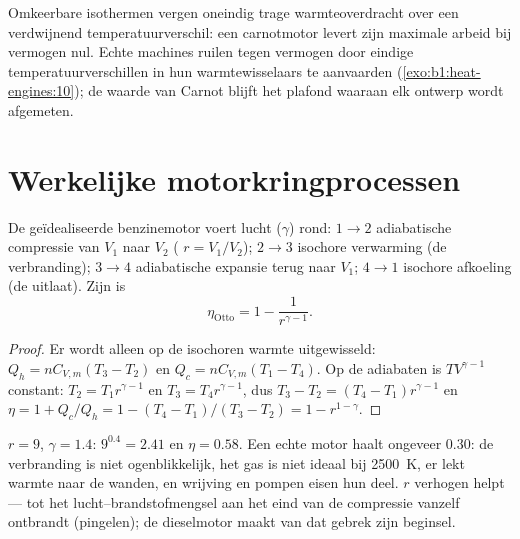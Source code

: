 \begin{remark}\label{rem:b1:heat-engines:notengine}
Omkeerbare isothermen vergen oneindig trage warmteoverdracht over een
verdwijnend temperatuurverschil: een carnotmotor levert zijn maximale arbeid
bij vermogen nul. Echte machines ruilen  tegen vermogen door
eindige temperatuurverschillen in hun warmtewisselaars te aanvaarden
(\cref{exo:b1:heat-engines:10}); de waarde van Carnot blijft het plafond
waaraan elk ontwerp wordt afgemeten.
\end{remark}

\section{Werkelijke motorkringprocessen}

\begin{proposition}[Ottokringproces]\label{prop:b1:heat-engines:otto}
De geïdealiseerde benzinemotor voert lucht ($\gamma$) rond: $1 \to 2$
adiabatische compressie van $V_1$ naar $V_2$ (\emph{}
$r = V_1/V_2$); $2 \to 3$ isochore verwarming (de verbranding); $3 \to 4$
adiabatische expansie terug naar $V_1$; $4 \to 1$ isochore afkoeling (de
uitlaat). Zijn  is
\[
\eta_{\text{Otto}} = 1 - \frac{1}{r^{\gamma-1}} .
\]
\end{proposition}

\begin{proof}
Er wordt alleen op de isochoren warmte uitgewisseld: $Q_h = nC_{V,m}(T_3 - T_2)$ en
$Q_c = nC_{V,m}(T_1 - T_4)$. Op de adiabaten is $TV^{\gamma-1}$ constant:
$T_2 = T_1r^{\gamma-1}$ en $T_3 = T_4r^{\gamma-1}$, dus $T_3 - T_2 =
(T_4 - T_1)r^{\gamma-1}$ en
$\eta = 1 + Q_c/Q_h = 1 - (T_4 - T_1)/(T_3 - T_2) = 1 - r^{1-\gamma}$.
\end{proof}

\begin{example}\label{ex:b1:heat-engines:ottonumbers}
$r = 9$, $\gamma = 1.4$: $9^{0.4} = 2.41$ en $\eta = 0.58$. Een echte motor
haalt ongeveer $0.30$: de verbranding is niet ogenblikkelijk, het gas is niet
ideaal bij \qty{2500}{K}, er lekt warmte naar de wanden, en wrijving en pompen
eisen hun deel. $r$ verhogen helpt --- tot het lucht--brandstofmengsel
aan het eind van de compressie vanzelf ontbrandt (pingelen); de dieselmotor
maakt van dat gebrek zijn beginsel.
\end{example}

